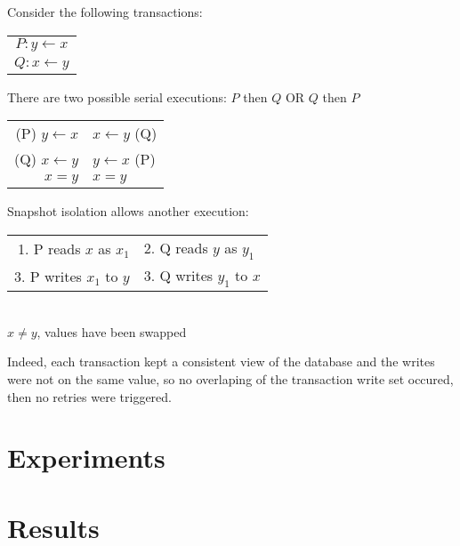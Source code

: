 \documentclass[a4paper, 10pt, titlepage]{report}
\begin{document}
Consider the following transactions:
\begin{table}[H]
  \centering
  \begin{tabular}{ c }
    $P:   y \gets x$\\
    $Q:   x \gets y$\\
  \end{tabular}
\end{table}


There are two possible serial executions: $P$ then $Q$ OR $Q$ then $P$
\begin{table}[H]
  \centering
  \begin{tabular}{ r | l }
    (P) $y \gets x$ & $x \gets y$ (Q) \\
    (Q) $x \gets y$ & $y \gets x$ (P) \\
    $x = y$ & $x = y$ \\
  \end{tabular}
\end{table}

Snapshot isolation allows another execution:

\begin{table}[H]
  \centering
  \begin{tabular}{ r | l }
    1. P reads $x$ as $x_1$ & 2. Q reads $y$ as $y_1$ \\
    3. P writes $x_1$ to $y$ & 3. Q writes $y_1$ to $x$ \\
  \end{tabular}
  \\
  $x \neq y$, values have been swapped
\end{table}

Indeed, each transaction kept a consistent view of the database and the writes were not on the same value, so no overlaping of the transaction write set occured, then no retries were triggered.

\section{Experiments}


\section{Results}

\clearpage
{}
{}

\printbibliography[title={Book references},type=book]
\printbibliography[title={Article references},type=article]
\printbibliography[title={Other references}, nottype=article, nottype=book]
\end{document}
